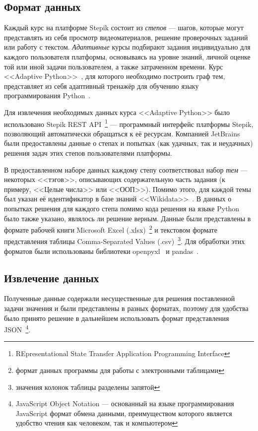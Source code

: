\documentclass[14pt]{matmex-diploma-custom}
\begin{document}
\subsection{Формат данных}
Каждый курс на платформе Stepik состоит из \textit{степов} --- шагов, которые могут представлять из себя просмотр видеоматериалов, решение проверочных заданий или работу с текстом. \textit{Адаптивные} курсы подбирают задания индивидуально для каждого пользователя платформы, основываясь на уровне знаний, личной оценке той или иной задачи пользователем, а также затраченном времени. Курс <<Adaptive Python>>~\cite{adapython}, для которого необходимо построить граф тем, представляет из себя адаптивный тренажёр для обучению языку программирования Python~\cite{Python}. 

Для извлечения необходимых данных курса <<Adaptive Python>> было использовано Stepik REST API~\footnote{REpresentational State Transfer Application Programming Interface} --- программный интерфейс платформы Stepik, позволяющий автоматически обращаться к её ресурсам. Компанией JetBrains были предоставлены данные о степах и попытках (как удачных, так и неудачных) решения задач этих степов пользователями платформы.

В предоставленном наборе данных каждому степу соответствовал набор \textit{тем} --- некоторых <<тэгов>>, описывающих содержательную часть задания (к примеру, <<Целые числа>> или <<ООП>>). Помимо этого, для каждой темы был указан её идентификатор в базе знаний <<Wikidata>>~\cite{wikidata}. В данных о попытках решения для каждого степа помимо кода решения на языке Python было также указано, являлось ли решение верным. Данные были представлены в формате рабочей книги Microsoft Excel (.xlsx)~\footnote{формат данных программы для работы с электронными таблицами} и текстовом формате представления таблицы Comma-Separated Values (.csv)~\footnote{значения колонок таблицы разделены запятой}. Для обработки этих форматов были использованы библиотеки openpyxl~\cite{openpyxl} и pandas~\cite{pandas}.

\subsection{Извлечение данных}
Полученные данные содержали несущественные для решения поставленной задачи значения и были представлены в разных форматах, поэтому для удобства было принято решение в дальнейшем использовать формат представления JSON~\footnote{JavaScript Object Notation --- основанный на языке программирования JavaScript формат обмена данными, преимуществом которого является удобство чтения как человеком, так и компьютером}.
\end{document}
